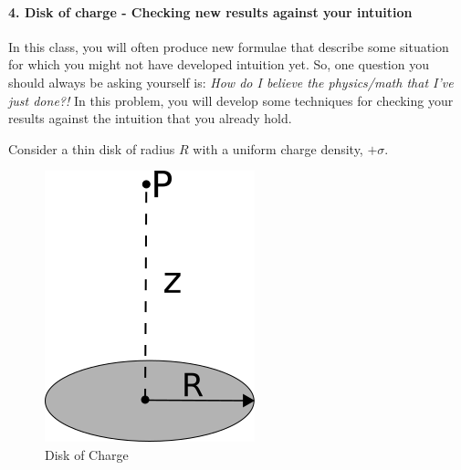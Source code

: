 \documentclass[11pt]{article}
\begin{document}
\paragraph{4. Disk of charge - Checking new results against your
intuition}\label{disk-of-charge---checking-new-results-against-your-intuition}

In this class, you will often produce new formulae that describe some
situation for which you might not have developed intuition yet. So, one
question you should always be asking yourself is: \emph{How do I believe
the physics/math that I've just done?!} In this problem, you will
develop some techniques for checking your results against the intuition
that you already hold.

Consider a thin disk of radius \(R\) with a uniform charge density,
\(+\sigma\).

\begin{figure}[htbp]
\centering
\includegraphics{./images/hw2/disk_of_charge.png}
\caption{Disk of Charge}
\end{figure}
\end{document}
